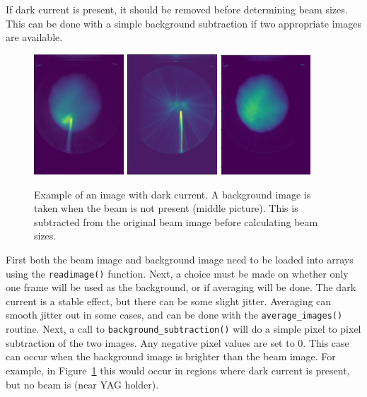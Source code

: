 If dark current is present, it should be removed before determining beam sizes.
This can be done with a simple background subtraction if two appropriate images are available.
\begin{figure}
	\centering
	\includegraphics[width=0.3\textwidth]{images/darkcurrent}
	\includegraphics[width=0.3\textwidth]{images/backgroundonly}
	\includegraphics[width=0.3\textwidth]{images/background_cutout}%
	\caption{Example of an image with dark current. A background image is taken 
	when the beam is not present (middle picture). This is subtracted from the original beam image
	before calculating beam sizes.}
	\label{fig:backgroundsubtraction}
\end{figure}
First both the beam image and background image need to be loaded into 
arrays using the \verb|readimage()| function.
Next, a choice must be made on whether only one frame will be used 
as the background, or if averaging will be done. 
The dark current is a stable effect, but there can be some slight jitter.
Averaging can smooth jitter out in some cases, and can be done with 
the \verb|average_images()| routine. 
Next, a call to \verb|background_subtraction()| will do a simple pixel to 
pixel subtraction of the two images. Any negative pixel values are set to 0.
This case can occur when the background image is brighter than the beam image. 
For example, in Figure~\ref{fig:backgroundsubtraction} this would occur in regions 
where dark current is present, but no beam is (near YAG holder). 


